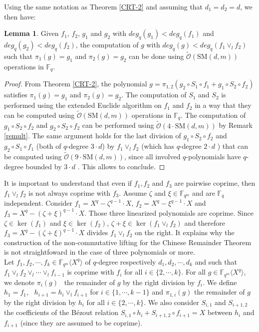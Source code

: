 \documentclass{article}
\newcommand{\Fq}{\mathbb{F}_q}
\newcommand{\SM}[2]{\text{SM}(#1,#2)}
\newcommand{\sO}{\tilde{\mathcal{O}}}
\theoremstyle{definition}
\newtheorem{lemma}[theorem]{Lemma}
\begin{document}
Using the same notation as Theorem \ref{CRT-2} and assuming that $d_1=d_2=d$, we then have:
\begin{lemma} \label{lemcomp1}
      Given $f_1$, $f_2$, $g_1$ and $g_2$ with $deg_q(g_1)<deg_q(f_1)$ and $deg_q(g_2) < deg_q(f_2)$, the computation of $g$ with $deg_q
            (g)< deg_q(f_1  \vee_l f_2)$ such that $\pi_1(g)=g_1$ and $\pi_2(g)=g_2$ can be done using $\sO(\SM{d}{m})$ operations in $\Fq$.
\end{lemma}

\begin{proof}
      From Theorem \ref{CRT-2}, the polynomial $g= \pi_{1,2} (g_2 \circ S_1 \circ f_1 +  g_1 \circ S_2 \circ f_2)$ satisfies
      $\pi_1(g)=g_1$ and $\pi_2(g)=g_2$. The computation of $S_1$ and $S_2$ is performed using the extended Euclide algorithm on $f_1$ and
      $f_2$ in a way that they can be computed using $\sO(\SM{d}{m})$ operations in $\Fq$.
      The computation of $g_1 \circ S_2 \circ f_2$ and $g_2 \circ S_2 \circ f_2$ can be performed using $\sO(4 \cdot \SM{d}{m})$ by Remark \ref{remult}.
      The same argument holds for the last division of $g_1 \circ S_2 \circ f_2$ and $g_2 \circ S_1 \circ f_1$ (both of $q$-degree $3 \cdot d$) by $f_1 \vee_l f_2$ (which has $q$-degree $2 \cdot d$ )
      that can be computed using $\sO(9 \cdot \SM{d}{m})$, since all involved $q$-polynomials have $q$-degree bounded by $3 \cdot d$ . This allows to conclude.
\end{proof}

\color{black}

\noindent It is important to understand that even if $f_1, f_2$ and $f_3$ are pairwise coprime, then $f_1 \vee_l f_2$ is not always coprime with $f_3$. Assume
$\zeta$ and $\xi \in \mathbb{F}_{q^m}$ and are $\mathbb{F}_q$ independent.
Consider $f_1 = X^q - \zeta^{q - 1} \cdot X$, $f_2 = X^q - \xi^{q - 1} \cdot
      X$ and $f_3 = X^q - (\zeta + \xi)^{q - 1} \cdot X$. Those three linearized
polynomials are coprime. Since $\zeta \in \ker (f_1)$ and $\xi \in \ker
      (f_2)$, $\zeta + \xi \in \ker (f_1 \vee_l f_2)$ and therefore $f_3 = X^q -
            (\zeta + \xi)^{q - 1}  \cdot X$ divides $f_1 \vee_l f_2$ on the right. It explains why
the construction of the non-commutative lifting for the Chinese Remainder
Theorem is not straightfoward in the case of three polynomials or more. \\

\noindent Let $f_1, f_2, \cdots, f_k \in \mathbb{F}_{q^m} \langle X^q \rangle$ of
$q$-degree respectively $d_1, d_2, \cdots, d_k$ and such that $f_1 \vee_l f_2
      \vee_l \cdots \vee_l f_{i - 1}$ is coprime with $f_i$ for all $i \in \{ 2,
      \cdots, k \}$. For all $g \in \mathbb{F}_{q^m} \langle X^q \rangle$, we denote
$\pi_i (g)$ \ the remainder of $g$ by the right division by $f_i$. We define
$h_1 = f_1$, \ $h_{i + 1} = h_i \vee_l f_{i + 1}$ for $i \in \{ 1, \cdots, k -
      1 \}$ and $\pi_{1, i} (g)$ the remainder of $g$ by the right division by $h_i$
for all $i \in \{ 2, \cdots, k \}$. We also consider $S_{i, 1}$ and $S_{i+1, 2}$
the coefficients of the B{\'e}zout relation $S_{i, 1} \circ h_i + S_{i+1, 2}
      \circ f_{i+1} = X$ between $h_i$ and $f_{i+1}$ (since they are assumed to be coprime).
\end{document}
